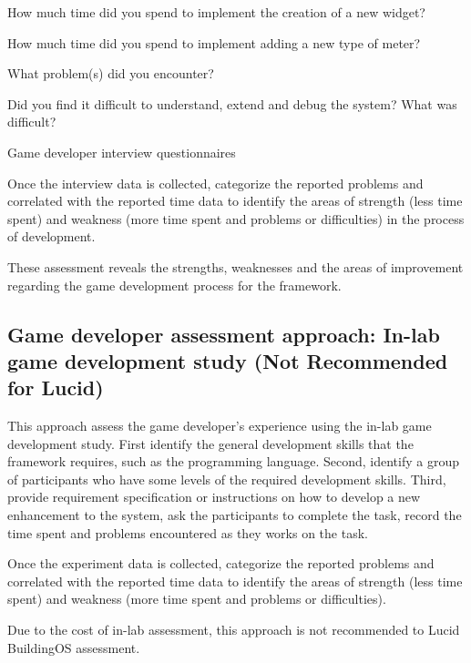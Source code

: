 \documentclass[11pt,oneside]{book}
\begin{document}
\begin{table}[ht!]
\begin{mybox}
\begin{compactenum}
\item How much time did you spend to implement the creation of a new widget?
\item How much time did you spend to implement adding a new type of meter?
\item What problem(s) did you encounter?
\item Did you find it difficult to understand, extend and debug the system? What was difficult?
\end{compactenum}
\end{mybox}
\caption{Game developer interview questionnaires}
\label{fig:game-developer-interview}  
\end{table}

Once the interview data is collected, categorize the reported problems and correlated with the reported time data to identify the areas of strength (less time spent) and weakness (more time spent and problems or difficulties) in the process of development. 

These assessment reveals the strengths, weaknesses and the areas of improvement regarding the game development process for the framework.

\subsection{Game developer assessment approach: In-lab game development study (Not Recommended for Lucid)}
\label{In-lab game development study}

This approach assess the game developer's experience using the in-lab game development study.  
First identify the general development skills that the framework requires, such as the programming language. 
Second, identify a group of participants who have some levels of the required development skills. Third, provide 
requirement specification or instructions on how to develop a new enhancement to the system, ask the 
participants to complete the task, record the time spent and problems encountered as they works on the task.

Once the experiment data is collected, categorize the reported problems and correlated with the reported time data 
to identify the areas of strength (less time spent) and weakness (more time spent and problems or difficulties). 

Due to the cost of in-lab assessment, this approach is not recommended to Lucid BuildingOS assessment.

\end{document}
